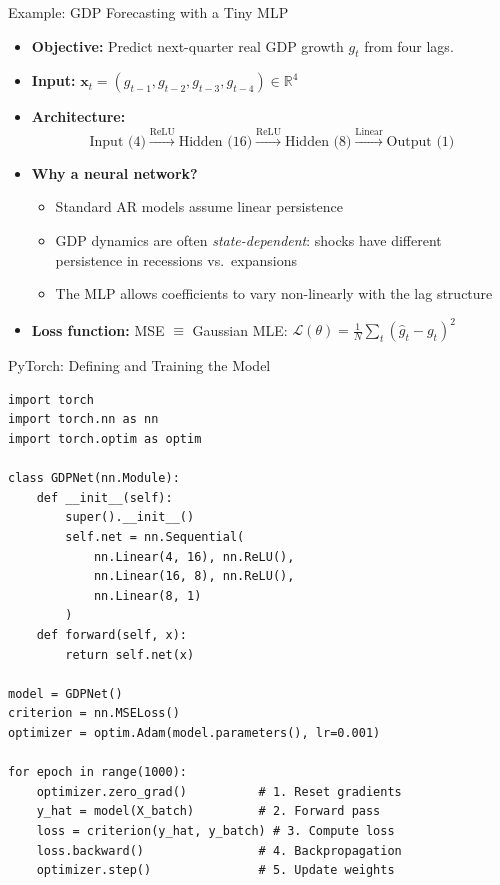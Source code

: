 \documentclass[10pt,english,aspectratio=169]{beamer}
\begin{document}
\begin{frame}{Example: GDP Forecasting with a Tiny MLP}
\begin{itemize}
\item \textbf{Objective:} Predict next-quarter real GDP growth $g_t$ from four lags.

\item \textbf{Input:} $\mathbf{x}_t = (g_{t-1}, g_{t-2}, g_{t-3}, g_{t-4}) \in \mathbb{R}^4$

\item \textbf{Architecture:}
\[
\text{Input (4)} \xrightarrow{\text{ReLU}} \text{Hidden (16)} \xrightarrow{\text{ReLU}} \text{Hidden (8)} \xrightarrow{\text{Linear}} \text{Output (1)}
\]

\item \textbf{Why a neural network?}
\begin{itemize}
    \item Standard AR models assume linear persistence
    \item GDP dynamics are often \emph{state-dependent}: shocks have different persistence in recessions vs.\ expansions
    \item The MLP allows coefficients to vary non-linearly with the lag structure
\end{itemize}

\item \textbf{Loss function:} MSE $\equiv$ Gaussian MLE:
$\mathcal{L}(\theta) = \frac{1}{N}\sum_t (\hat{g}_t - g_t)^2$
\end{itemize}
\end{frame}

\begin{frame}[fragile]{PyTorch: Defining and Training the Model}

\begin{lstlisting}[style=pythonstyle]
import torch
import torch.nn as nn
import torch.optim as optim

class GDPNet(nn.Module):
    def __init__(self):
        super().__init__()
        self.net = nn.Sequential(
            nn.Linear(4, 16), nn.ReLU(),
            nn.Linear(16, 8), nn.ReLU(),
            nn.Linear(8, 1)
        )
    def forward(self, x):
        return self.net(x)

model = GDPNet()
criterion = nn.MSELoss()
optimizer = optim.Adam(model.parameters(), lr=0.001)

for epoch in range(1000):
    optimizer.zero_grad()          # 1. Reset gradients
    y_hat = model(X_batch)         # 2. Forward pass
    loss = criterion(y_hat, y_batch) # 3. Compute loss
    loss.backward()                # 4. Backpropagation
    optimizer.step()               # 5. Update weights
\end{lstlisting}
\end{frame}
\end{document}
